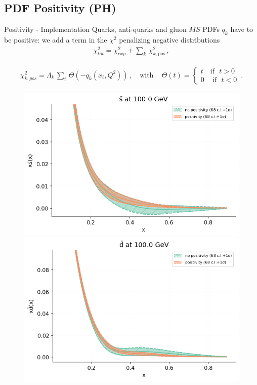 \author[Tommaso Giani]{}
\subsection{PDF Positivity (PH)}

\begin{frame}{Positivity - Implementation}
	Quarks, anti-quarks and gluon $\overline{MS}$ PDFs $q_k$ have to be positive: we add a term in the $\chi^2$ penalizing negative distributions
	\begin{align*}
		\label{eq:chi2pos_integ}
		\chi^2_{tot} = \chi^2_{exp} + \sum_k\, \chi^2_{k,\text{pos}}\,,
	\end{align*}

	\begin{align*}
		\chi^2_{k,pos} = \Lambda_k \,\sum_i \,\Theta\left(-q_k\left(x_i,Q^2\right)\right)\,,\,\,\,\,\,\,
		\text{with}\,\,\,\,\,\,\,
		\Theta\left(t\right) = 
		\begin{cases}
			t \,\,\,\,\,\,\text{if}\,\,\,\, t>0 \\
			0\,\,\,\,\,\,\,\text{if}\,\,\,\, t<0
		\end{cases}\,.
	\end{align*} 
	\begin{figure}[h!]
		\includegraphics[scale=0.32]{pos_integ/plot_pdfs_bars_pos.png}
		\includegraphics[scale=0.32]{pos_integ/plot_pdfs_bard_pos.png}
	\end{figure}
\end{frame}


